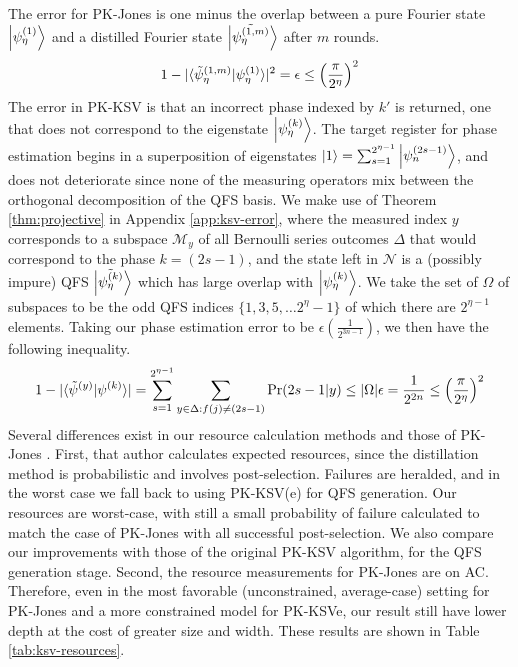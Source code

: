 The error for PK-Jones is one minus the overlap between a
pure Fourier state $\left\vert{\psi_{\eta}^{(1)}}\right\rangle$ and a distilled
Fourier state $\left\vert{\tilde{\psi_{\eta}^{(1,m)}}}\right\rangle$ after $m$ rounds.
%
\begin{equation}
1 - | \langle \tilde{\psi}^{(1,m)}_{\eta}|\psi_{\eta}^{(1)} \rangle |^2 = \epsilon \le \left( \frac{\pi}{2^{\eta}} \right)^2 
\end{equation}
%
The error in PK-KSV is that an incorrect phase indexed by $k'$ is returned,
one that does not correspond to the eigenstate $\left\vert{\psi_{\eta}^{(k)}}\right\rangle$.
The target
register for phase estimation begins in a superposition of eigenstates
$\left\vert{1}\right\rangle = \sum_{s = 1}^{2^{{\eta}-1}} \left\vert{\psi^{(2s-1)}_n}\right\rangle$, and does not deteriorate
since none of the measuring operators mix between the orthogonal decomposition of the
QFS basis. We make use of Theorem \ref{thm:projective} in Appendix \ref{app:ksv-error},
where the measured index $y$ corresponds to a subspace $\mathcal{M}_y$ of all Bernoulli series outcomes $\Delta$ that would
correspond to the phase $k = (2s-1)$, and the state left in $\mathcal{N}$ is a (possibly impure)
QFS $\left\vert{\tilde{\psi_{\eta}^{(k)}}}\right\rangle$ which has large overlap with
$\left\vert{\psi_{\eta}^{(k)}}\right\rangle$.
We take the set of $\Omega$ of subspaces to be the odd QFS indices $\{1, 3, 5, \ldots 2^{\eta} - 1\}$
of which there are $2^{{\eta}-1}$ elements. Taking our phase estimation error to be $\epsilon \left( \frac{1}{2^{3n-1}} \right)$,
we then have the following inequality.
%
\begin{equation}
1 - | \langle \tilde{\psi}^{(y)}|\psi^{(k)} \rangle | = \sum_{s = 1}^{2^{{\eta}-1}} \sum_{y \in \Delta: f(j) \ne (2s-1)} \Pr(2s-1|y) \le |\Omega|\epsilon = \frac{1}{2^{2n}} \le \left( \frac{\pi}{2^{\eta}} \right)^2 
\end{equation}
%
Several differences exist in our resource
calculation methods and those of PK-Jones \cite{Jones2012}. First, that
author calculates expected resources, since the distillation method is
probabilistic and involves post-selection. Failures are heralded, and in
the worst case we fall back to using PK-KSV(e) for QFS generation.
Our resources are worst-case,
with still a small probability of failure calculated to match the
case of PK-Jones with all successful post-selection. We also compare our
improvements with those of the original PK-KSV algorithm, for the QFS generation stage.
Second, the resource measurements for PK-Jones are on
\textsf{AC}. Therefore, even in the most favorable (unconstrained, average-case) setting for
PK-Jones and a more constrained model for PK-KSVe, our result still have
lower depth at the cost of greater size and width.
These results are shown in Table \ref{tab:ksv-resources}.

